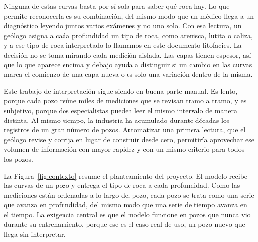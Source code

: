 \documentclass[11pt,a4paper]{article}
\begin{document}
Ninguna de estas curvas basta por sí sola para saber qué roca hay. Lo que permite reconocerla es su combinación, del mismo modo que un médico llega a un diagnóstico leyendo juntos varios exámenes y no uno solo. Con esa lectura, un geólogo asigna a cada profundidad un tipo de roca, como arenisca, lutita o caliza, y a ese tipo de roca interpretado lo llamamos en este documento litofacies. La decisión no se toma mirando cada medición aislada. Las capas tienen espesor, así que lo que aparece encima y debajo ayuda a distinguir si un cambio en las curvas marca el comienzo de una capa nueva o es solo una variación dentro de la misma.

Este trabajo de interpretación sigue siendo en buena parte manual. Es lento, porque cada pozo reúne miles de mediciones que se revisan tramo a tramo, y es subjetivo, porque dos especialistas pueden leer el mismo intervalo de manera distinta. Al mismo tiempo, la industria ha acumulado durante décadas los registros de un gran número de pozos. Automatizar una primera lectura, que el geólogo revise y corrija en lugar de construir desde cero, permitiría aprovechar ese volumen de información con mayor rapidez y con un mismo criterio para todos los pozos.

La Figura~\ref{fig:contexto} resume el planteamiento del proyecto. El modelo recibe las curvas de un pozo y entrega el tipo de roca a cada profundidad. Como las mediciones están ordenadas a lo largo del pozo, cada pozo se trata como una serie que avanza en profundidad, del mismo modo que una serie de tiempo avanza en el tiempo. La exigencia central es que el modelo funcione en pozos que nunca vio durante su entrenamiento, porque ese es el caso real de uso, un pozo nuevo que llega sin interpretar.
\end{document}
